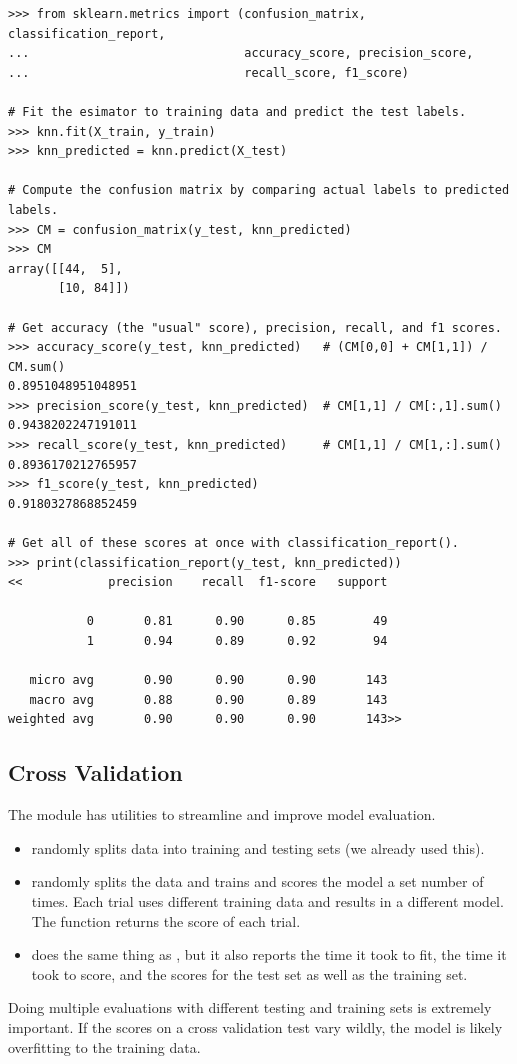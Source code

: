 \begin{lstlisting}
>>> from sklearn.metrics import (confusion_matrix, classification_report,
...                              accuracy_score, precision_score,
...                              recall_score, f1_score)

# Fit the esimator to training data and predict the test labels.
>>> knn.fit(X_train, y_train)
>>> knn_predicted = knn.predict(X_test)

# Compute the confusion matrix by comparing actual labels to predicted labels.
>>> CM = confusion_matrix(y_test, knn_predicted)
>>> CM
array([[44,  5],
       [10, 84]])

# Get accuracy (the "usual" score), precision, recall, and f1 scores.
>>> accuracy_score(y_test, knn_predicted)   # (CM[0,0] + CM[1,1]) / CM.sum()
0.8951048951048951
>>> precision_score(y_test, knn_predicted)  # CM[1,1] / CM[:,1].sum()
0.9438202247191011
>>> recall_score(y_test, knn_predicted)     # CM[1,1] / CM[1,:].sum()
0.8936170212765957
>>> f1_score(y_test, knn_predicted)
0.9180327868852459

# Get all of these scores at once with classification_report().
>>> print(classification_report(y_test, knn_predicted))
<<            precision    recall  f1-score   support

           0       0.81      0.90      0.85        49
           1       0.94      0.89      0.92        94

   micro avg       0.90      0.90      0.90       143
   macro avg       0.88      0.90      0.89       143
weighted avg       0.90      0.90      0.90       143>>
\end{lstlisting}

\subsection*{Cross Validation} %

The  module has utilities to streamline and improve model evaluation.

\begin{itemize}
    \item {} randomly splits data into training and testing sets (we already used this).
    \item {} randomly splits the data and trains and scores the model a set number of times.
    Each trial uses different training data and results in a different model.
    The function returns the score of each trial.
    \item {} does the same thing as , but it also reports the time it took to fit, the time it took to score, and the scores for the test set as well as the training set.
\end{itemize}
%
Doing multiple evaluations with different testing and training sets is extremely important.
If the scores on a cross validation test vary wildly, the model is likely overfitting to the training data.

